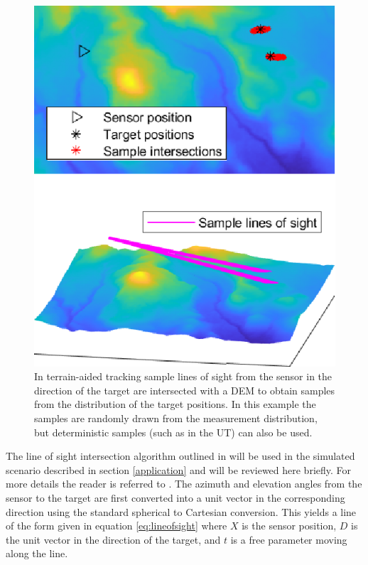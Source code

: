 \documentclass[journal]{IEEEtran}
\begin{document}
\begin{figure}[ht]
    \centering
    \includegraphics[scale=1.0]{TerrainTrackingExample.eps}
    \caption{In terrain-aided tracking sample lines of sight from the sensor in the direction of the target are intersected with a DEM to obtain samples from the distribution of the target positions. In this example the samples are randomly drawn from the measurement distribution, but deterministic samples (such as in the UT) can also be used.}
    \label{fig:lostrackingexample}
\end{figure}

The line of sight intersection algorithm outlined in \cite{schonborn2022terrain} will be used in the simulated scenario described in section \ref{application} and will be reviewed here briefly. For more details the reader is referred to \cite{schonborn2022terrain}. The azimuth and elevation angles from the sensor to the target are first converted into a unit vector in the corresponding direction using the standard spherical to Cartesian conversion. This yields a line of the form given in equation \ref{eq:lineofsight} where $X$ is the sensor position, $D$ is the unit vector in the direction of the target, and $t$ is a free parameter moving along the line.
\end{document}
